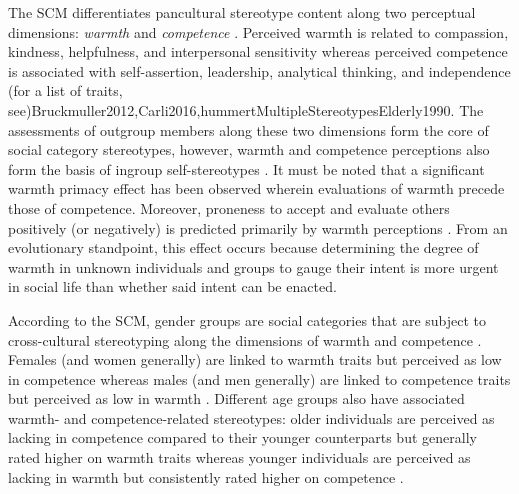 \documentclass[Royal,sageapa,times]{sagej}
\begin{document}
The SCM differentiates pancultural stereotype content along two perceptual dimensions: \emph{warmth} and  \emph{competence} . Perceived warmth is related to compassion, kindness, helpfulness, and interpersonal sensitivity whereas perceived competence is associated with self-assertion, leadership, analytical thinking, and independence \shortcite(for a list of traits, see){Bruckmuller2012,Carli2016,hummertMultipleStereotypesElderly1990}. The assessments of outgroup members along these two dimensions form the core of social category stereotypes, however, warmth and competence perceptions also form the basis of ingroup self-stereotypes . It must be noted that a significant warmth primacy effect has been observed wherein evaluations of warmth precede those of competence. Moreover, proneness to accept and evaluate others positively (or negatively) is predicted primarily by warmth perceptions . From an evolutionary standpoint, this effect occurs because determining the degree of warmth in unknown individuals and groups to gauge their intent is more urgent in social life than whether said intent can be enacted.

According to the SCM, gender groups are social categories that are subject to cross-cultural stereotyping along the dimensions of warmth and competence . Females (and women generally) are linked to warmth traits but perceived as low in competence whereas males (and men generally) are linked to competence traits but perceived as low in warmth . Different age groups also have associated warmth- and competence-related stereotypes: older individuals are perceived as lacking in competence compared to their younger counterparts but generally rated higher on warmth traits whereas younger individuals are perceived as lacking in warmth but consistently rated higher on competence .
\end{document}
